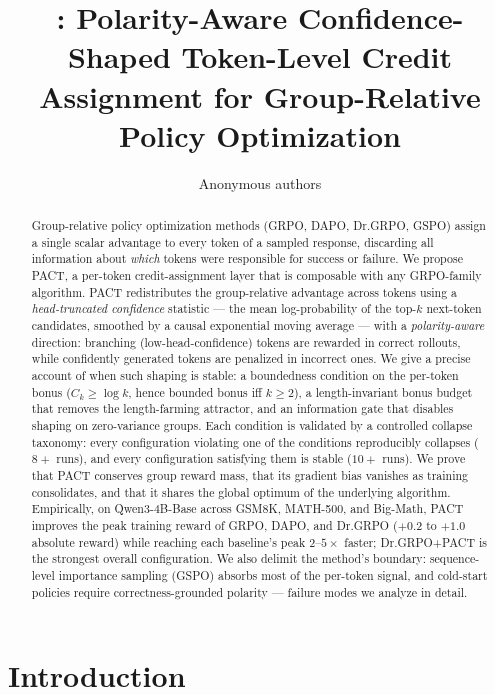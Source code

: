 \documentclass{article} %
\title{\method{}: Polarity-Aware Confidence-Shaped Token-Level Credit Assignment for Group-Relative Policy Optimization}
\author{Anonymous authors}
\theoremstyle{plain}
\theoremstyle{definition}
\theoremstyle{remark}
\newcommand{\method}{PACT}
\begin{document}
\maketitle

\begin{abstract}
Group-relative policy optimization methods (GRPO, DAPO, Dr.GRPO, GSPO) assign a single scalar advantage to every token of a sampled response, discarding all information about \emph{which} tokens were responsible for success or failure. We propose \method{}, a per-token credit-assignment layer that is composable with any GRPO-family algorithm. \method{} redistributes the group-relative advantage across tokens using a \emph{head-truncated confidence} statistic --- the mean log-probability of the top-$k$ next-token candidates, smoothed by a causal exponential moving average --- with a \emph{polarity-aware} direction: branching (low-head-confidence) tokens are rewarded in correct rollouts, while confidently generated tokens are penalized in incorrect ones. We give a precise account of when such shaping is stable: a boundedness condition on the per-token bonus ($C_k \ge \log k$, hence bounded bonus iff $k \ge 2$), a length-invariant bonus budget that removes the length-farming attractor, and an information gate that disables shaping on zero-variance groups. Each condition is validated by a controlled collapse taxonomy: every configuration violating one of the conditions reproducibly collapses ($8{+}$ runs), and every configuration satisfying them is stable ($10{+}$ runs). We prove that \method{} conserves group reward mass, that its gradient bias vanishes as training consolidates, and that it shares the global optimum of the underlying algorithm. Empirically, on Qwen3-4B-Base across GSM8K, MATH-500, and Big-Math, \method{} improves the peak training reward of GRPO, DAPO, and Dr.GRPO ($+0.2$ to $+1.0$ absolute reward) while reaching each baseline's peak $2$--$5\times$ faster; Dr.GRPO+\method{} is the strongest overall configuration. We also delimit the method's boundary: sequence-level importance sampling (GSPO) absorbs most of the per-token signal, and cold-start policies require correctness-grounded polarity --- failure modes we analyze in detail.
\end{abstract}

\section{Introduction}
\label{sec:intro}
\end{document}
